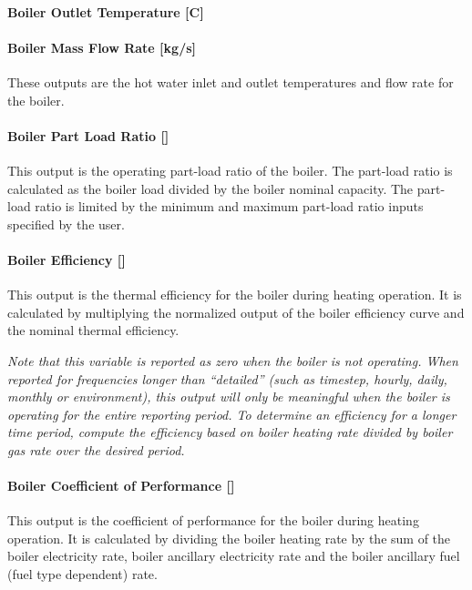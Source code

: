 \paragraph{Boiler Outlet Temperature {[}C{]}}\label{boiler-outlet-temperature-c}

\paragraph{Boiler Mass Flow Rate {[}kg/s{]}}\label{boiler-mass-flow-rate-kgs}

These outputs are the hot water inlet and outlet temperatures and flow rate for the boiler.

\paragraph{Boiler Part Load Ratio {[]}}\label{boiler-part-load-ratio}

This output is the operating part-load ratio of the boiler. The part-load ratio is calculated as the boiler load divided by the boiler nominal capacity. The part-load ratio is limited by the minimum and maximum part-load ratio inputs specified by the user.

\paragraph{Boiler Efficiency {[]}}\label{boiler-efficiency}

This output is the thermal efficiency for the boiler during heating operation. It is calculated by multiplying the normalized output of the boiler efficiency curve and the nominal thermal efficiency.

\emph{Note that this variable is reported as zero when the boiler is not operating. When reported for frequencies longer than ``detailed'' (such as timestep, hourly, daily, monthly or environment), this output will only be meaningful when the boiler is operating for the entire reporting period. To determine an efficiency for a longer time period, compute the efficiency based on boiler heating rate divided by boiler gas rate over the desired period.}

\paragraph{Boiler Coefficient of Performance {[]}}\label{boiler-coefficient-of-performance}

This output is the coefficient of performance for the boiler during heating operation. It is calculated by dividing the boiler heating rate by the sum of the boiler electricity rate, boiler ancillary electricity rate and the boiler ancillary fuel (fuel type dependent) rate.

